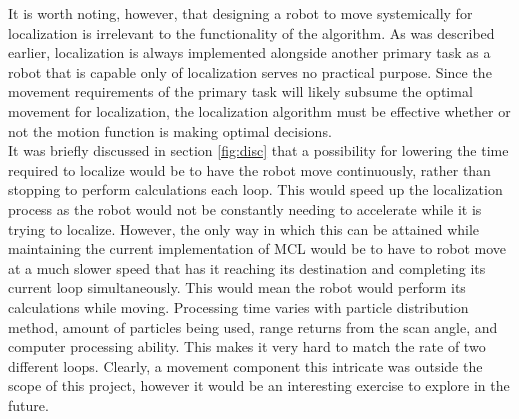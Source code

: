 \documentclass{article}
\begin{document}
It is worth noting, however, that designing a robot to move systemically for localization is irrelevant to the functionality of the algorithm. As was described earlier, localization is always implemented alongside another primary task as a robot that is capable only of localization serves no practical purpose. Since the movement requirements of the primary task will likely subsume the optimal movement for localization, the localization algorithm must be effective whether or not the motion function is making optimal decisions.\\

It was briefly discussed in section \ref{fig:disc} that a possibility for lowering the time required to localize would be to have the robot move continuously, rather than stopping to perform calculations each loop. This would speed up the localization process as the robot would not be constantly needing to accelerate while it is trying to localize. However, the only way in which this can be attained while maintaining the current implementation of MCL would be to have to robot move at a much slower speed that has it reaching its destination and completing its current loop simultaneously. This would mean the robot would perform its calculations while moving. Processing time varies with particle distribution method, amount of particles being used, range returns from the scan angle, and computer processing ability. This makes it very hard to match the rate of two different loops. Clearly, a movement component this intricate was outside the scope of this project, however it would be an interesting exercise to explore in the future.
\end{document}
